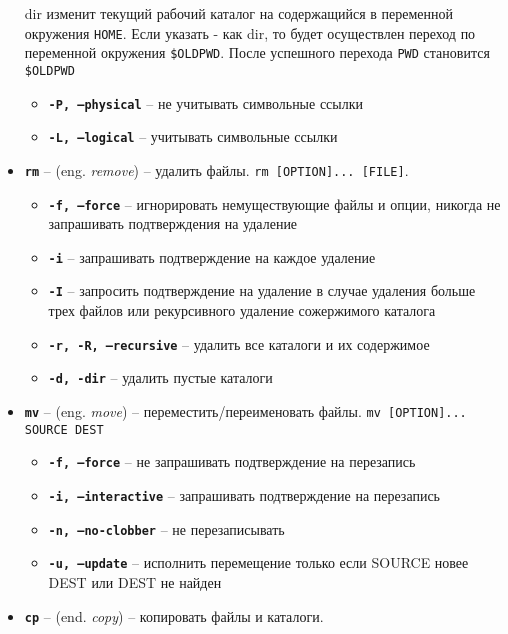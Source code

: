 \documentclass[12pt, a4paper]{article}
\begin{document}
\begin{itemize}
    dir изменит текущий рабочий каталог на содержащийся в переменной окружения
    \texttt{HOME}. Если указать - как dir, то будет осуществлен переход по
    переменной окружения \texttt{\$OLDPWD}. После успешного перехода \texttt{PWD}
    становится \texttt{\$OLDPWD}
    \begin{itemize}
      \item \textbf{\texttt{-P, --physical}} -- не учитывать символьные ссылки
      \item \textbf{\texttt{-L, --logical}} -- учитывать символьные ссылки
    \end{itemize}
  \item \textbf{\texttt{rm}} -- (eng. \textit{remove}) -- удалить файлы.
    \texttt{rm [OPTION]... [FILE]}.
    \begin{itemize}
      \item \textbf{\texttt{-f, --force}} -- игнорировать немуществующие файлы
        и опции, никогда не запрашивать подтверждения на удаление
      \item \textbf{\texttt{-i}} -- запрашивать подтверждение на каждое удаление
      \item \textbf{\texttt{-I}} -- запросить подтверждение на удаление в случае
        удаления больше трех файлов или рекурсивного удаление сожержимого
        каталога
      \item \textbf{\texttt{-r, -R, --recursive}} -- удалить все каталоги и их
        содержимое
      \item \textbf{\texttt{-d, -dir}} -- удалить пустые каталоги
    \end{itemize}
  \item \textbf{\texttt{mv}} -- (eng. \textit{move}) -- переместить/переименовать
    файлы. \texttt{mv [OPTION]... SOURCE DEST}
    \begin{itemize}
      \item \textbf{\texttt{-f, --force}} -- не запрашивать подтверждение на
        перезапись
      \item \textbf{\texttt{-i, --interactive}} -- запрашивать подтверждение на
        перезапись
      \item \textbf{\texttt{-n, --no-clobber}} -- не перезаписывать
      \item \textbf{\texttt{-u, --update}} -- исполнить перемещение только если
        SOURCE новее DEST или DEST не найден
    \end{itemize}
  \item \textbf{\texttt{cp}} -- (end. \textit{copy}) -- копировать файлы и каталоги.

\end{itemize}
\end{document}
